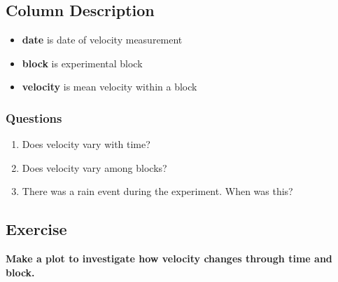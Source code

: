 \documentclass[11pt]{article}
\begin{document}
\subsection{Column Description}
\label{sec:orgheadline6}
\begin{itemize}
\item \textbf{date} is date of velocity measurement
\item \textbf{block} is experimental block
\item \textbf{velocity} is mean velocity within a block
\end{itemize}

\subsubsection{Questions}
\label{sec:orgheadline5}

\begin{enumerate}
\item Does velocity vary with time?

\item Does velocity vary among blocks?

\item There was a rain event during the experiment. When was this?
\end{enumerate}


\subsection{Exercise}
\label{sec:orgheadline7}

\textbf{Make a plot to investigate how velocity changes through time and block.}
\end{document}
